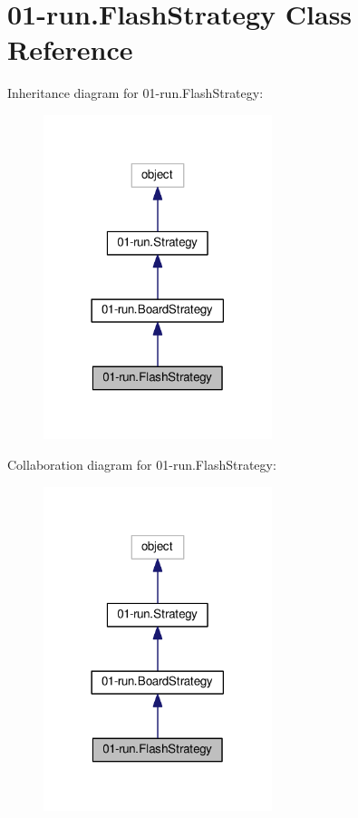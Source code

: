 \hypertarget{class01-run_1_1FlashStrategy}{}\section{01-\/run.Flash\+Strategy Class Reference}
\label{class01-run_1_1FlashStrategy}


Inheritance diagram for 01-\/run.Flash\+Strategy\+:
\nopagebreak
\begin{figure}[H]
\begin{center}
\leavevmode
\includegraphics[width=189pt]{class01-run_1_1FlashStrategy__inherit__graph}
\end{center}
\end{figure}


Collaboration diagram for 01-\/run.Flash\+Strategy\+:
\nopagebreak
\begin{figure}[H]
\begin{center}
\leavevmode
\includegraphics[width=189pt]{class01-run_1_1FlashStrategy__coll__graph}
\end{center}
\end{figure}
